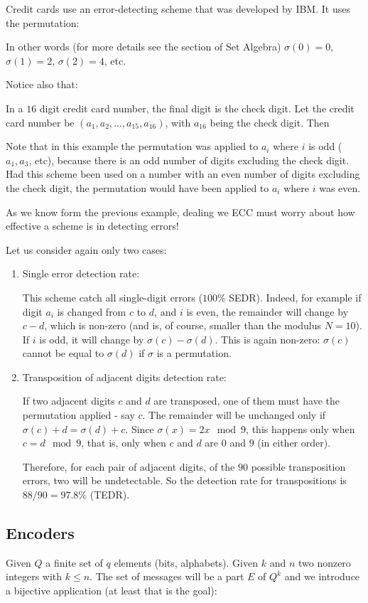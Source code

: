 	Credit cards use an error-detecting scheme that was developed by IBM. It uses the permutation:
	
	In other words (for more details see the section of Set Algebra) $\sigma (0)=0$, $\sigma (1)=2$, $\sigma (2)=4$, etc.
	
	Notice also that:
	

	In a $16$ digit credit card number, the final digit is the check digit. Let the credit card number be $(a_1, a_2,\ldots , a_{15}, a_{16})$, with $a_{16}$ being the check digit. Then
	
	Note that in this example the permutation was applied to $a_ i$ where $i$ is odd ($a_1, a_3$, etc), because there is an odd number of digits excluding the check digit. Had this scheme been used on a number with an even number of digits excluding the check digit, the permutation would have been applied to $a_ i$ where $i$ was even.
	
	As we know form the previous example, dealing we ECC must worry about how effective a scheme is in detecting errors!
	
	Let us consider again only two cases:
	\begin{enumerate}
		\item Single error detection rate:

		This scheme catch all single-digit errors ($100\%$ SEDR). Indeed, for example if digit $a_ i$ is changed from $c$ to $d$, and $i$ is even, the remainder will change by $c-d$, which is non-zero (and is, of course, smaller than the modulus $N=10$). If $i$ is odd, it will change by $\sigma (c)-\sigma (d)$. This is again non-zero: $\sigma (c)$ cannot be equal to $\sigma (d)$ if $\sigma $ is a permutation.

		\item Transposition of adjacent digits detection rate:
		
		If two adjacent digits $c$ and $d$ are transposed, one of them must have the permutation applied - say $c$. The remainder will be unchanged only if $\sigma (c)+d = \sigma (d)+c$. Since $\sigma (x) = 2x \mod 9$, this happens only when $c = d \mod 9$, that is, only when $c$ and $d$ are $0$ and $9$ (in either order).
		
		Therefore, for each pair of adjacent digits, of the $90$ possible transposition errors, two will be undetectable. So the detection rate for transpositions is $88/90 = 97.8\% $ (TEDR).
	\end{enumerate}
	
	\subsection{Encoders}
	Given $Q$ a finite set of $q$ elements (bits, alphabets). Given $k$ and $n$ two  nonzero integers with $k\leq n$. The set of messages will be a part $E$ of $Q^k$ and we introduce a bijective application (at least that is the goal):
	
